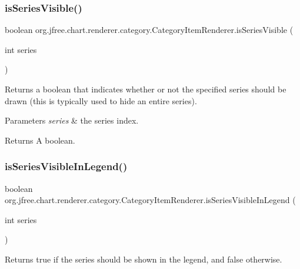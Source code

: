 \subsubsection{\texorpdfstring{is\+Series\+Visible()}{isSeriesVisible()}}
{\footnotesize\ttfamily boolean org.\+jfree.\+chart.\+renderer.\+category.\+Category\+Item\+Renderer.\+is\+Series\+Visible (\begin{DoxyParamCaption}\item[{int}]{series }\end{DoxyParamCaption})}

Returns a boolean that indicates whether or not the specified series should be drawn (this is typically used to hide an entire series).


\begin{DoxyParams}{Parameters}
{\em series} & the series index.\\
\hline
\end{DoxyParams}
\begin{DoxyReturn}{Returns}
A boolean. 
\end{DoxyReturn}
\mbox{\label{interfaceorg_1_1jfree_1_1chart_1_1renderer_1_1category_1_1_category_item_renderer_a24e073dff573e5ebc13bfafc81c9bfc5}} 
\subsubsection{\texorpdfstring{is\+Series\+Visible\+In\+Legend()}{isSeriesVisibleInLegend()}}
{\footnotesize\ttfamily boolean org.\+jfree.\+chart.\+renderer.\+category.\+Category\+Item\+Renderer.\+is\+Series\+Visible\+In\+Legend (\begin{DoxyParamCaption}\item[{int}]{series }\end{DoxyParamCaption})}

Returns {\ttfamily true} if the series should be shown in the legend, and {\ttfamily false} otherwise.


